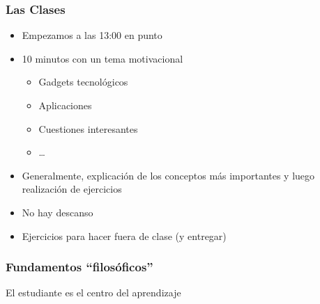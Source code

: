 \begin{frame}
\frametitle{Las Clases}

{\Large
\begin{itemize}
  \item Empezamos a las 13:00 en punto
  \item 10 minutos con un tema motivacional
  \begin{itemize}
    \item Gadgets tecnológicos
    \item Aplicaciones
    \item Cuestiones interesantes
    \item \dots
  \end{itemize}
  \item Generalmente, explicación de los conceptos más importantes y luego
realización de ejercicios
  \item No hay descanso
  \item Ejercicios para hacer fuera de clase (y entregar)
\end{itemize}
}
\end{frame}




\begin{frame}
\frametitle{Fundamentos ``filosóficos''}

\vspace{-2.75cm}

\begin{center}
\Huge El estudiante es el centro del aprendizaje
\end{center}

\end{frame}
\usebackgroundtemplate{}



